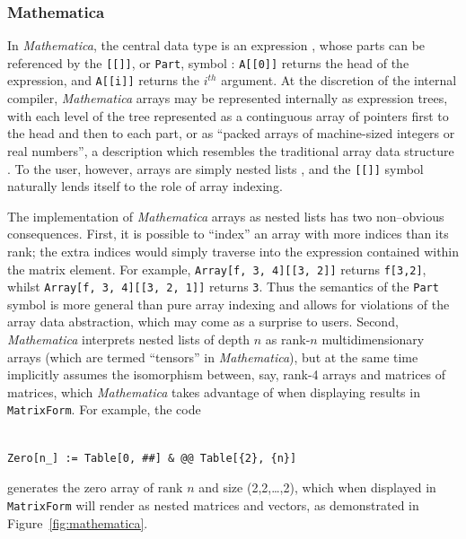 \documentclass[preprint]{sigplanconf}
\newcommand{\Mathematica}{\textit{Mathematica}}
\newcommand{\code}[1]{\texttt{#1}}
\begin{document}

\subsubsection{Mathematica}

In \Mathematica, the central data type is an expression
\cite{mathematica:expr}, whose parts can be referenced by the
\code{[[]]}, or \code{Part}, symbol \cite{mathematica:part}: \code{A[[0]]}
returns the head of the expression, and \code{A[[i]]} returns the $i^{th}$
argument. At the discretion of the internal compiler, \Mathematica{} arrays
may be represented internally as expression trees, with each level of the tree
represented as a continguous array of pointers first to the head and then to
each part, or as ``packed arrays of machine-sized integers or real numbers'',
a description which resembles the traditional array data structure
\cite{mathematica:int}. To the user, however, arrays are simply nested lists
\cite{mathematica:nl}, and the \code{[[]]} symbol naturally lends itself to
the role of array indexing.

The implementation of \Mathematica{} arrays as nested lists has two non--obvious
consequences. First, it is possible to ``index'' an array with more
indices than its rank; the extra indices would simply traverse into the
expression contained within the matrix element. For example, \code{Array[f,
{3, 4}][[3, 2]]} returns \code{f[3,2]}, whilst \code{Array[f, {3, 4}][[3, 2,
1]]} returns \code{3}. Thus the semantics of the \code{Part} symbol is more
general than pure array indexing and allows for violations of the array data
abstraction, which may come as a surprise to users. Second, \Mathematica{}
interprets nested lists of depth $n$ as rank-$n$ multidimensionary arrays
(which are termed ``tensors'' in \Mathematica), but at the same time
implicitly assumes the isomorphism between, say, rank-4 arrays and matrices of
matrices, which \Mathematica{} takes advantage of when displaying results in
\code{MatrixForm}. For example, the code
\begin{verbatim}

Zero[n_] := Table[0, ##] & @@ Table[{2}, {n}]

\end{verbatim}
generates the zero array of rank $n$ and size (2,2,\dots,2), which when 
displayed in \code{MatrixForm} will render as nested matrices and vectors, as 
demonstrated in Figure~\ref{fig:mathematica}.
\end{document}
